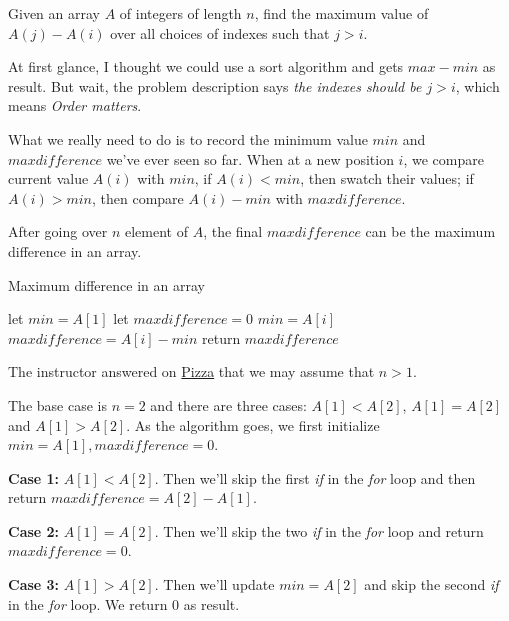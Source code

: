 \newpage
{} %

\problemdes

Given an array $A$ of integers of length $n$, find the maximum value of $A(j) - A(i)$ over all choices of indexes such that $j > i$.

\solution


At first glance, I thought we could use a sort algorithm and gets $max - min$ as result. But wait, the problem description says \textit{the indexes should be $j > i$}, which means \textit{Order matters}. 

What we really need to do is to record the minimum value $min$ and $maxdifference$ we've ever seen so far. When at a new position $i$, we compare current value $A(i)$ with $min$, if $A(i) < min$, then swatch their values; if $A(i) > min$, then compare $A(i) - min$ with $maxdifference$.

After going over $n$ element of $A$, the final $maxdifference$ can be the maximum difference in an array.


\begin{algorithm}[]
  \caption{Maximum difference in an array}
  let $min = A[1]$\;
  let $maxdifference = 0$\;
  {
    {
        $min = A[i]$\;
    }
    {
        $maxdifference = A[i] - min$\;
    }
  }
  return $maxdifference$\;
\end{algorithm}


The instructor answered on \href{https://piazza.com/class/k10yypdn1hf7ld?cid=11}{Pizza} that we may assume that $n>1$. 

The base case is $n=2$ and there are three cases: $A[1] < A[2]$, $A[1] = A[2]$ and $A[1] > A[2]$. As the algorithm goes, we first initialize $min=A[1], maxdifference=0$. 

\textbf{Case 1:} $A[1] < A[2]$. Then we'll skip the first \textit{if} in the \textit{for} loop and then return $maxdifference=A[2]-A[1]$.

\textbf{Case 2:} $A[1] = A[2]$. Then we'll skip the two \textit{if} in the \textit{for} loop and return $maxdifference=0$.

\textbf{Case 3:} $A[1] > A[2]$. Then we'll update $min=A[2]$ and skip the second \textit{if} in the \textit{for} loop. We return $0$ as result.

